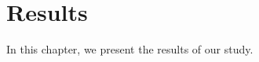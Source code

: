 
\chapter{Results\label{ch:conclusion}}

In this chapter, we present the results of our study.



%
%
